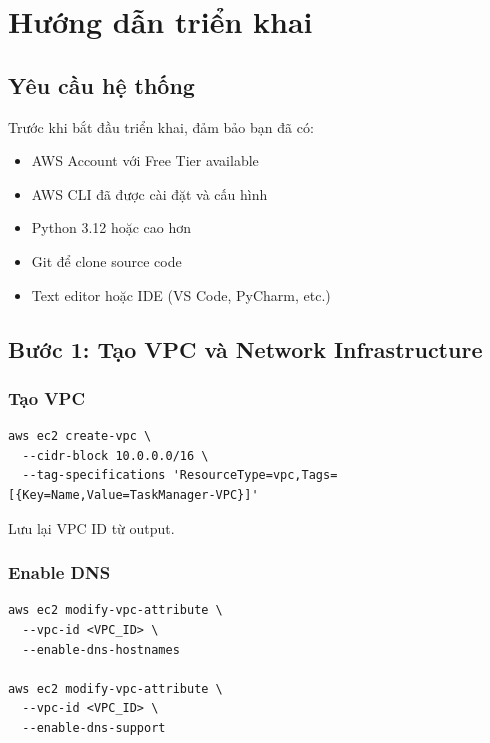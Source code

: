 \appendix

\section{Hướng dẫn triển khai}
\label{apd:deployment}

\subsection{Yêu cầu hệ thống}
\label{ssec:requirements}

Trước khi bắt đầu triển khai, đảm bảo bạn đã có:

\begin{itemize}
    \item AWS Account với Free Tier available
    \item AWS CLI đã được cài đặt và cấu hình
    \item Python 3.12 hoặc cao hơn
    \item Git để clone source code
    \item Text editor hoặc IDE (VS Code, PyCharm, etc.)
\end{itemize}

\subsection{Bước 1: Tạo VPC và Network Infrastructure}
\label{ssec:deploy_vpc}

\subsubsection{Tạo VPC}

\begin{verbatim}
aws ec2 create-vpc \
  --cidr-block 10.0.0.0/16 \
  --tag-specifications 'ResourceType=vpc,Tags=[{Key=Name,Value=TaskManager-VPC}]'
\end{verbatim}

Lưu lại VPC ID từ output.

\subsubsection{Enable DNS}

\begin{verbatim}
aws ec2 modify-vpc-attribute \
  --vpc-id <VPC_ID> \
  --enable-dns-hostnames

aws ec2 modify-vpc-attribute \
  --vpc-id <VPC_ID> \
  --enable-dns-support
\end{verbatim}

